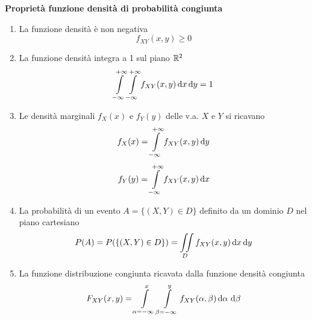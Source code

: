 \textbf{Proprietà funzione densità di probabilità congiunta}
\begin{enumerate}
\item La funzione densità è non negativa
\begin{equation}
	f_{XY}(x,y)\geq 0
\end{equation}
\item La funzione densità integra a 1 sul piano $\mathbb{R}^2$
\begin{equation}
	\int\limits_{-\infty}^{+\infty}{\int\limits_{-\infty}^{+\infty}{f_{XY}(x,y)}{\,\mathop{}\!\mathrm{d}{x}}}{\,\mathop{}\!\mathrm{d}{y}}=1
\end{equation}
\item Le densità marginali $f_X(x)$ e $f_Y(y)$ delle v.a. $X$ e $Y$ si ricavano
\begin{equation}
	f_X(x)=\int\limits_{-\infty}^{+\infty}{f_{XY}(x,y)}{\,\mathop{}\!\mathrm{d}{y}}
\end{equation}
\begin{equation}
	f_Y(y)=\int\limits_{-\infty}^{+\infty}{f_{XY}(x,y)}{\,\mathop{}\!\mathrm{d}{x}}
\end{equation}
\item La probabilità di un evento $A=\{(X,Y)\in D\}$ definito da un dominio $D$ nel piano cartesiano
\begin{equation}
\label{eq:funz_dens_prob_cong_dominio}
	P(A)=P(\{(X,Y)\in D\})=\iint\limits_{D}{f_{XY}(x,y)\mathop{}\!\mathrm{d} x \mathop{}\!\mathrm{d} y}
\end{equation}
\item La funzione distribuzione congiunta ricavata dalla funzione densità congiunta
\begin{equation}
	F_{XY}(x,y)=\int\limits_{\alpha=-\infty}^{x}\int\limits_{\beta=-\infty}^{y}{f_{XY}(\alpha,\beta)}{\,\mathop{}\!\mathrm{d} \alpha\,\mathop{}\!\mathrm{d} \beta}
\end{equation}
\end{enumerate}

%
{
    \pgfsetlinewidth{0.4pt}
    \pgfpathmoveto{\pgfqpoint{0pt}{0pt}}
    \pgfpathlineto{\pgfqpoint{\LineSpace + 0.1pt}{\LineSpace + 0.1pt}}
}
\makeatother %
\newdimen\LineSpace
{}
%
{
    \pgfpathcircle{\pgfqpoint{0pt}{0pt}}{.5pt}
    \pgfpathcircle{\pgfqpoint{3pt}{3pt}}{.5pt}
}

